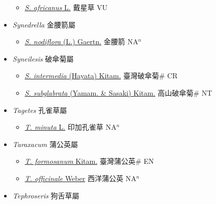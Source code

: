 \begin{itemize}
  \begin{itemize}
        \item[] \href{http://www.theplantlist.org/tpl1.1/search?q=Sphaeranthus+africanus}{\textit{S. africanus} L.}   戴星草 VU
  \end{itemize}
 \item[] \textit{Synedrella} 金腰箭屬
                    
  \begin{itemize}
        \item[] \href{http://www.theplantlist.org/tpl1.1/search?q=Synedrella+nodiflora}{\textit{S. nodiflora} (L.) Gaertn.}   金腰箭 NA$^n$
  \end{itemize}
 \item[] \textit{Syneilesis} 破傘菊屬
                    
  \begin{itemize}
        \item[] \href{http://www.theplantlist.org/tpl1.1/search?q=Syneilesis+intermedia}{\textit{S. intermedia} (Hayata) Kitam.}   臺灣破傘菊\# CR
        \item[] \href{http://www.theplantlist.org/tpl1.1/search?q=Syneilesis+subglabrata}{\textit{S. subglabrata} (Yamam. \& Sasaki) Kitam.}   高山破傘菊\# NT
  \end{itemize}
 \item[] \textit{Tagetes} 孔雀草屬
                    
  \begin{itemize}
        \item[] \href{http://www.theplantlist.org/tpl1.1/search?q=Tagetes+minuta}{\textit{T. minuta} L.}   印加孔雀草 NA$^n$
  \end{itemize}
 \item[] \textit{Taraxacum} 蒲公英屬
                    
  \begin{itemize}
        \item[] \href{http://www.theplantlist.org/tpl1.1/search?q=Taraxacum+formosanum}{\textit{T. formosanum} Kitam.}   臺灣蒲公英\# EN
        \item[] \href{http://www.theplantlist.org/tpl1.1/search?q=Taraxacum+officinale}{\textit{T. officinale} Weber}   西洋蒲公英 NA$^n$
  \end{itemize}
 \item[] \textit{Tephroseris} 狗舌草屬
                    

\end{itemize}
